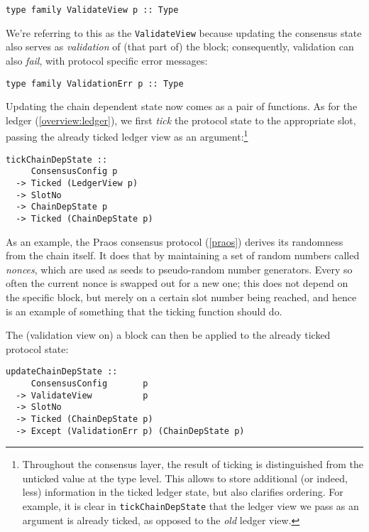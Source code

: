 \begin{lstlisting}
type family ValidateView p :: Type
\end{lstlisting}

We're referring to this as the \lstinline!ValidateView! because updating the
consensus state also serves as \emph{validation} of (that part of) the block;
consequently, validation can also \emph{fail}, with protocol specific error
messages:

\begin{lstlisting}
type family ValidationErr p :: Type
\end{lstlisting}

Updating the chain dependent state now comes as a pair of functions. As for the ledger
(\cref{overview:ledger}), we first \emph{tick} the protocol state to the
appropriate slot, passing the already ticked ledger view as an
argument:\footnote{Throughout the consensus layer, the result of ticking is
distinguished from the unticked value at the type level. This allows to store
additional (or indeed, less) information in the ticked ledger state, but also
clarifies ordering. For example, it is clear in \lstinline!tickChainDepState!
that the ledger view we pass as an argument is already ticked, as opposed to the
\emph{old} ledger view.}

\begin{lstlisting}
tickChainDepState ::
     ConsensusConfig p
  -> Ticked (LedgerView p)
  -> SlotNo
  -> ChainDepState p
  -> Ticked (ChainDepState p)
\end{lstlisting}

As an example, the Praos consensus protocol (\cref{praos}) derives its
randomness from the  chain itself. It does that by maintaining a set of random
numbers called \emph{nonces}, which are used as seeds to pseudo-random number
generators. Every so often the current nonce is swapped out for a new one; this
does not depend on the specific block, but merely on a certain slot number being
reached, and hence is an example of something that the ticking function should
do.

The (validation view on) a block can then be applied to the already ticked
protocol state:

\begin{lstlisting}
updateChainDepState ::
     ConsensusConfig       p
  -> ValidateView          p
  -> SlotNo
  -> Ticked (ChainDepState p)
  -> Except (ValidationErr p) (ChainDepState p)
\end{lstlisting}

